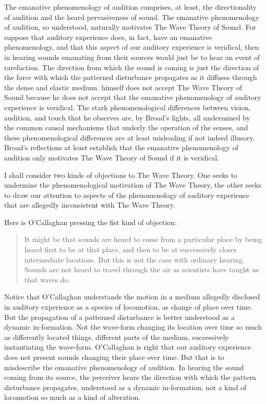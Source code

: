 \documentclass[12pt]{article}
\begin{document}
The emanative phenomenology of audition comprises, at least, the directionality of audition and the heard pervasiveness of sound. The emanative phenomenology of audition, so understood, naturally motivates The Wave Theory of Sound. For suppose that auditory experience does, in fact, have an emanative phenomenology, and that this aspect of our auditory experience is veridical, then in hearing sounds emanating from their sources would just be to hear an event of rarefaction. The direction from which the sound is coming is just the direction of the force with which the patterned disturbance propagates as it diffuses through the dense and elastic medium. \citet{Broad:1952kx} himself does not accept The Wave Theory of Sound because he does not accept that the emanative phenomenology of auditory experience is veridical. The stark phenomenological differences between vision, audition, and touch that he observes are, by Broad's lights, all undermined by the common causal mechanisms that underly the operation of the senses, and these phenomenological differences are at least misleading if not indeed illusory. Broad's reflections at least establish that the emanative phenomenology of audition only motivates The Wave Theory of Sound if it is veridical.

I shall consider two kinds of objections to The Wave Theory. One seeks to undermine the phenomenological motivation of The Wave Theory, the other seeks to draw our attention to aspects of the phenomenology of auditory experience that are allegedly inconsistent with The Wave Theory.

Here is O’Callaghan pressing the fist kind of objection:
\begin{quote}
	It might be that sounds are heard to come from a particular place by being heard first to be at that place, and then to be at successively closer intermediate locations. But this is not the case with ordinary hearing. Sounds are not heard to travel through the air as scientists have taught us that waves do. \citep[34]{OCallaghan:2007xy}
\end{quote}
Notice that O’Callaghan understands the motion in a medium allegedly disclosed in auditory experience as a species of locomotion, as change of place over time. But the propagation of a patterned disturbance is better understood as a dynamic in-formation. Not the wave-form changing its location over time so much as differently located things, different parts of the medium, successively instantiating the wave-form. O'Callaghan is right that our auditory experience does not present sounds changing their place over time. But that is to misdescribe the emanative phenomenology of audition. In hearing the sound coming from its source, the perceiver hears the direction with which the pattern disturbance propagates, understood as a dynamic in-formation, not a kind of locomotion so much as a kind of alteration.
\end{document}

